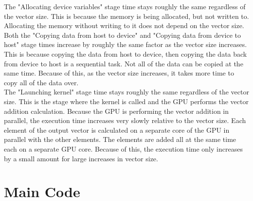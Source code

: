 \documentclass{article}
\begin{document}
The "Allocating device variables" stage time stays roughly the same regardless of the vector size. This is because the memory is being allocated, but not written to. Allocating the memory without writing to it does not depend on the vector size.\\

Both the "Copying data from host to device" and "Copying data from device to host" stage times increase by roughly the same factor as the vector size increases. This is because copying the data from host to device, then copying the data back from device to host is a sequential task. Not all of the data can be copied at the same time. Because of this, as the vector size increases, it takes more time to copy all of the data over.\\

The "Launching kernel" stage time stays roughly the same regardless of the vector size. This is the stage where the kernel is called and the GPU performs the vector addition calculation. Because the GPU is performing the vector addition in parallel, the execution time increases very slowly relative to the vector size. Each element of the output vector is calculated on a separate core of the GPU in parallel with the other elements. The elements are added all at the same time each on a separate GPU core. Because of this, the execution time only increases by a small amount for large increases in vector size.

\section{Main Code}
\end{document}
